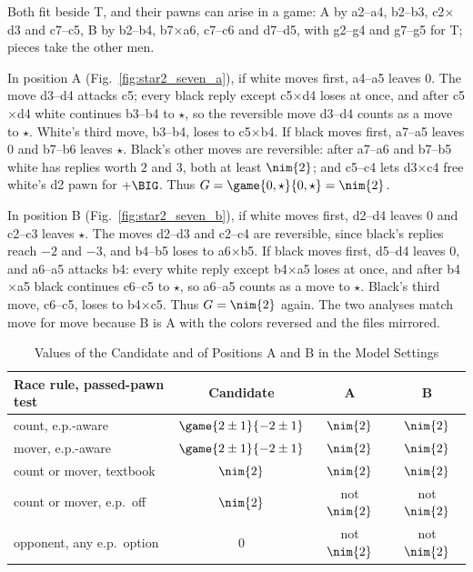 Both fit beside T, and their pawns can arise in a game: A by a2--a4, b2--b3, c2$\times$d3 and c7--c5, B by
b2--b4, b7$\times$a6, c7--c6 and d7--d5, with g2--g4 and g7--g5 for T; pieces take the other men.

In position A (Fig.~\ref{fig:star2_seven_a}), if white moves first, a4--a5 leaves $0$. The move d3--d4 attacks
c5; every black reply except c5$\times$d4 loses at once, and after c5$\times$d4 white continues b3--b4 to
$\star$, so the reversible move d3--d4 counts as a move to $\star$. White's third move, b3--b4, loses to
c5$\times$b4. If black moves first, a7--a5 leaves $0$ and b7--b6 leaves $\star$. Black's other moves are
reversible: after a7--a6 and b7--b5 white has replies worth $2$ and $3$, both at least $\nim{2}$; and c5--c4
lets d3$\times$c4 free white's d2 pawn for $+\BIG$. Thus
$G=\game{0,\star}{0,\star}=\nim{2}$.

In position B (Fig.~\ref{fig:star2_seven_b}), if white moves first, d2--d4 leaves $0$ and c2--c3 leaves
$\star$. The moves d2--d3 and c2--c4 are reversible, since black's replies reach $-2$ and $-3$, and b4--b5
loses to a6$\times$b5. If black moves first, d5--d4 leaves $0$, and a6--a5 attacks b4: every white reply except
b4$\times$a5 loses at once, and after b4$\times$a5 black continues c6--c5 to $\star$, so a6--a5 counts as a move
to $\star$. Black's third move, c6--c5, loses to b4$\times$c5. Thus $G=\nim{2}$ again. The two analyses
match move for move because B is A with the colors reversed and the files mirrored.

\begin{table}[!t]
\centering
\caption{Values of the Candidate and of Positions A and B in the Model Settings}
\label{tab:star2_settings}
\footnotesize
\setlength{\tabcolsep}{4pt}
\begin{tabular}{@{}lccc@{}}
\toprule
Race rule, passed-pawn test & Candidate & A & B\\
\midrule
count, e.p.-aware & $\game{2\pm1}{-2\pm1}$ & $\nim{2}$ & $\nim{2}$\\
mover, e.p.-aware & $\game{2\pm1}{-2\pm1}$ & $\nim{2}$ & $\nim{2}$\\
count or mover, textbook & $\nim{2}$ & $\nim{2}$ & $\nim{2}$\\
count or mover, e.p.\ off & $\nim{2}$ & not $\nim{2}$ & not $\nim{2}$\\
opponent, any e.p.\ option & $0$ & not $\nim{2}$ & not $\nim{2}$\\
\bottomrule
\end{tabular}
\end{table}


